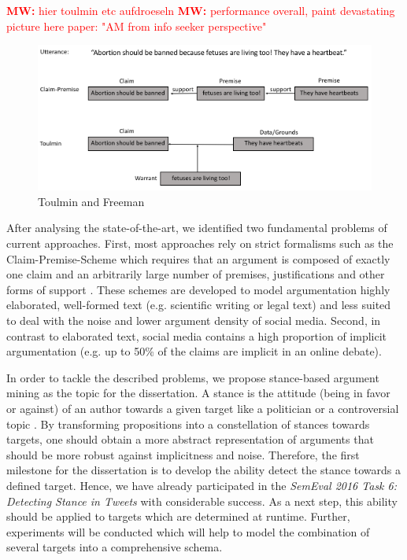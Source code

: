 \documentclass[11pt]{article}
\newcommand{\mw}[1]{\textcolor{red}{\textbf{MW:} #1}}
\newcommand{\mw}[1]{}
\begin{document}
\mw{hier toulmin etc aufdroeseln}
\mw{performance overall, paint devastating picture here paper: "AM from info seeker perspective"}

\begin{figure}[hbt]
\centering
  \includegraphics[width=.8\textwidth]{figures/claim_premise_toulmin.png}
  \caption{Toulmin and Freeman}
\end{figure}


After analysing the state-of-the-art, we identified two fundamental problems of current approaches.
First, most approaches rely on strict formalisms such as the Claim-Premise-Scheme which requires that an argument is composed of exactly one claim and an arbitrarily large number of premises, justifications and other forms of support \cite{habernal2014argumentation} .
These schemes are developed to model argumentation highly elaborated, well-formed text (e.g. scientific writing or legal text) and less suited to deal with the noise and lower argument density of social media.
Second, in contrast to elaborated text, social media contains a high proportion of implicit argumentation (e.g. up to 50\% of the claims are implicit in an online debate).

In order to tackle the described problems, we propose stance-based argument mining as the topic for the dissertation.
A stance is the attitude (being in favor or against) of an author towards a given target like a politician or a controversial topic \cite{StanceSemEval2016}.
By transforming propositions into a constellation of stances towards targets, one should obtain a more abstract representation of arguments that should be more robust against implicitness and noise.
Therefore, the first milestone for the dissertation is to develop the ability detect the stance towards a defined target. 
Hence, we have already participated in the \textit{\mbox{SemEval} 2016 Task 6: Detecting Stance in Tweets} with considerable success.
As a next step, this ability should be applied to targets which are determined at runtime.
Further, experiments will be conducted which will help to model the combination of several targets into a comprehensive schema.
\end{document}
